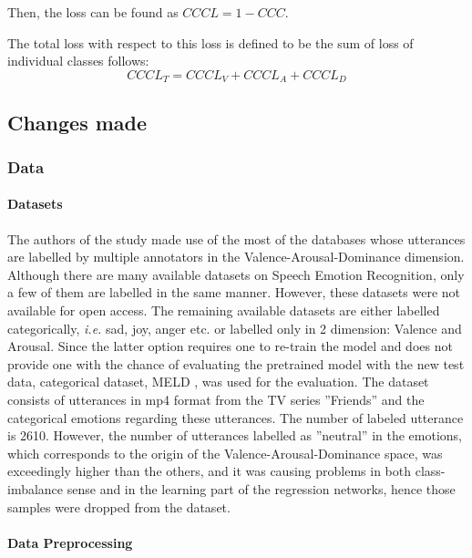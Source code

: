 \documentclass[a4paper,11pt]{article}
\begin{document}
Then, the loss can be found as $CCCL = 1 - CCC$.

The total loss with respect to this loss is defined to be the sum of loss of individual classes follows:
\begin{equation}
    CCCL_T = CCCL_V + CCCL_A + CCCL_D
    \label{eq:CCCLoss}
\end{equation}

\pagebreak

\subsection{Changes made}

\subsubsection{Data}

\paragraph{Datasets}

The authors of the study made use of the most of the databases whose utterances are labelled by multiple annotators in the Valence-Arousal-Dominance dimension. 
Although there are many available datasets on Speech Emotion Recognition, only a few of them are labelled in the same manner. However, these datasets were not available for open access. The remaining available datasets are either labelled categorically, \textit{i.e.} sad, joy, anger etc. or labelled only in 2 dimension: Valence and Arousal. Since the latter option requires one to re-train the model and does not provide one with the chance of evaluating the pretrained model with the new test data, categorical dataset, MELD \cite{atmaja2020deep}, was used for the evaluation. The dataset consists of utterances in mp4 format from the TV series ''Friends'' and the categorical emotions regarding these utterances. The number of labeled utterance is 2610. However, the number of utterances labelled as ''neutral'' in the emotions, which corresponds to the origin of the Valence-Arousal-Dominance space, was exceedingly higher than the others, and it was causing problems in both class-imbalance sense and in the learning part of the regression networks, hence those samples were dropped from the dataset.

\paragraph{Data Preprocessing}
\end{document}

